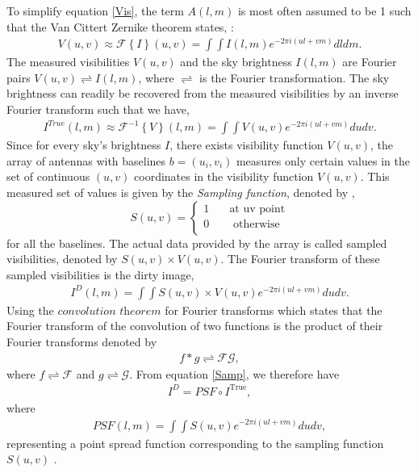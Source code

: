 To simplify equation \ref{Vis}, the term $A(l,m)$ is most often assumed to be 1 such that the Van Cittert Zernike theorem states, \citep{thompson2017interferometry}:
\begin{align}
V(u,v)\approx \mathcal{F}\left\{I\right\}(u,v)=\int \int I (l,m)e^{-2\pi i(ul+vm)} dl dm.
\label{V}
\end{align}
The measured visibilities $V(u,v)$ and the sky brightness  $I(l,m)$ are Fourier pairs $V(u,v) \rightleftharpoons I(l,m)$, where $\rightleftharpoons$ is the Fourier transformation. The sky
brightness can readily be recovered from the measured visibilities by an inverse Fourier transform such that we have, 
\begin{align}
I^{True}(l,m)\approx \mathcal{F}^{-1}\left\{V\right\}(l,m)=\int \int V (u,v)e^{-2\pi i(ul+vm)} du dv .
\end{align}
Since for every sky's brightness $I$, there exists visibility function $V(u,v)$, the array of antennas with baselines $b=(u_i,v_i)$  measures only certain values in the set of continuous  $(u,v)$ coordinates in the visibility function $V(u,v)$. This measured set of values is given by the \emph{Sampling function}, denoted by \citep{taylor1999synthesis}, \[ S(u,v) =
  \begin{cases}
    1   & \quad    \text{at uv point}\\
    0  & \quad  \text{ otherwise}\\
  \end{cases}
\] for all the baselines. The actual data provided by the array is called  sampled visibilities, denoted by  $S(u,v)\times V(u,v)$. The Fourier transform of these sampled visibilities is the dirty image,
\begin{align}
I^{D}(l,m)=\int \int S(u,v)\times V(u,v) e^{-2\pi i(ul+vm)} du dv.
\label{Samp}
\end{align} 
Using the $\textit{convolution theorem}$ for Fourier transforms which states that the Fourier transform of the convolution of two functions is the product of their Fourier transforms denoted by 
\begin{align}
f*g\rightleftharpoons \mathcal{F} \mathcal{G},
\end{align}
where $f\rightleftharpoons \mathcal{F}$ and $g\rightleftharpoons \mathcal{G}$.
From equation \ref{Samp}, we therefore have 
\begin{align}
I^{D}=PSF \circ I^{\mathrm{True}}, 
\end{align}
where 
\begin{align}
PSF(l,m) = \int \int S(u,v)e^{-2\pi i(ul+vm)} du dv,
\end{align}
representing a point spread function  corresponding to the sampling function $S(u,v)$ \citep{taylor1999synthesis}.


